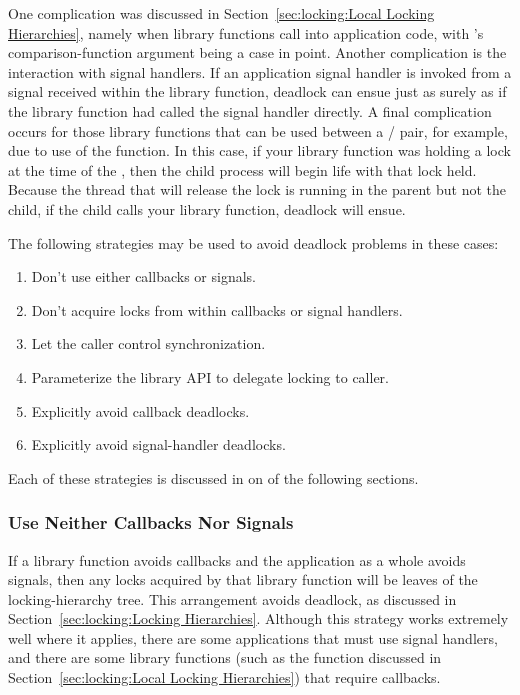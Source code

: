 One complication was discussed in
Section~\ref{sec:locking:Local Locking Hierarchies}, namely
when library functions call into application code, with 's
comparison-function argument being a case in point.
Another complication is the interaction with signal handlers.
If an application signal handler is invoked from a signal received within
the library function, deadlock can ensue just as surely as
if the library function had called the signal handler directly.
A final complication occurs for those library functions that can be used
between a / pair, for example, due to use of
the  function.
In this case, if your library function was holding a lock at the time of
the , then the child process will begin life with that lock held.
Because the thread that will release the lock is running in the parent
but not the child, if the child calls your library function, deadlock
will ensue.

The following strategies may be used to avoid deadlock problems in these cases:

\begin{enumerate}
\item	Don't use either callbacks or signals.
\item	Don't acquire locks from within callbacks or signal handlers.
\item	Let the caller control synchronization.
\item	Parameterize the library API to delegate locking to caller.
\item	Explicitly avoid callback deadlocks.
\item	Explicitly avoid signal-handler deadlocks.
\end{enumerate}

Each of these strategies is discussed in on of the following sections.

\subsubsection{Use Neither Callbacks Nor Signals}
\label{sec:locking:Use Neither Callbacks Nor Signals}

If a library function avoids callbacks and the application as a whole
avoids signals, then any locks acquired by that library function will
be leaves of the locking-hierarchy tree.
This arrangement avoids deadlock, as discussed in
Section~\ref{sec:locking:Locking Hierarchies}.
Although this strategy works extremely well where it applies,
there are some applications that must use signal handlers,
and there are some library functions (such as the  function
discussed in
Section~\ref{sec:locking:Local Locking Hierarchies})
that require callbacks.

